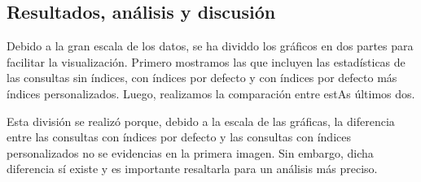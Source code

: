 \subsection{Resultados, análisis y discusión}
Debido a la gran escala de los datos, se ha dividdo los gráficos en dos partes para facilitar la visualización. Primero mostramos las que incluyen las estadísticas de las consultas sin índices, con índices por defecto y con índices por defecto más índices personalizados. Luego, realizamos la comparación entre estAs últimos dos.

Esta división se realizó porque, debido a la escala de las gráficas, la diferencia entre las consultas con índices por defecto y las consultas con índices personalizados no se evidencias en la primera imagen. Sin embargo, dicha diferencia sí existe y es importante resaltarla para un análisis más preciso.
